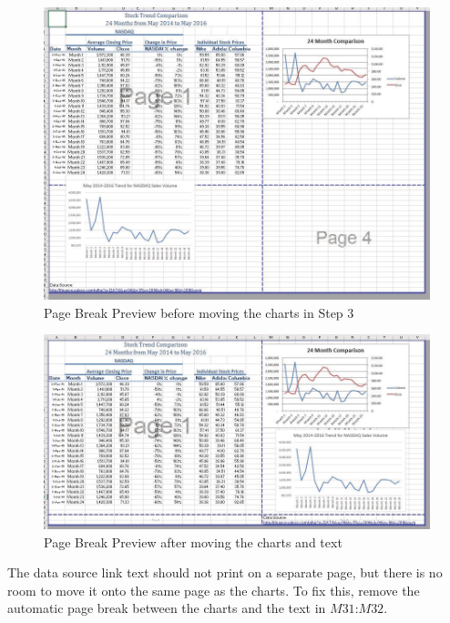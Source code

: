 \begin{figure}[H]
	\centering
	\includegraphics[width=\maxwidth{.95\linewidth}]{gfx/ch04_fig53}
	\caption{Page Break Preview before moving the charts in Step 3}
	\label{04:fig53}
\end{figure}

\begin{figure}[H]
	\centering
	\includegraphics[width=\maxwidth{.95\linewidth}]{gfx/ch04_fig54}
	\caption{Page Break Preview after moving the charts and text}
	\label{04:fig54}
\end{figure}

The data source link text should not print on a separate page, but there is no room to move it onto the same page as the charts. To fix this, remove the automatic page break between the charts and the text in $ M31 $:$ M32 $.


